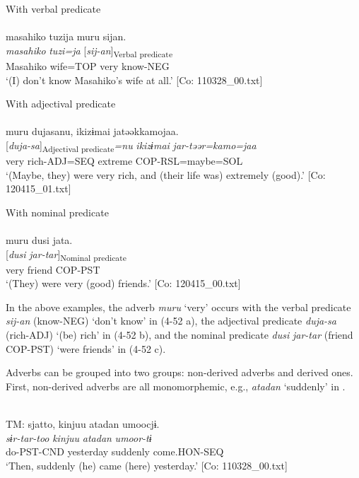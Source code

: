 \ea  \ea With verbal predicate \label{ex:4.52}\\\\
\glll    masahiko  tuzija  muru  sijan.\\
    \textit{masahiko}  \textit{tuzi=ja}  \textit{}  [\textit{sij-an}]\textsubscript{Verbal predicate}\\
    Masahiko  wife=TOP  very  know-NEG\\
    \glt     ‘(I) don’t know Masahiko’s wife at all.’ [Co: 110328\_00.txt]

  \ex With adjectival predicate\\\\
\glll    muru  dujasanu,  ikizɨmai  jatəəkkamojaa.\\
    \textit{}  [\textit{duja-sa}]\textsubscript{Adjectival predicate}\textit{=nu}  \textit{ikizɨmai}  \textit{jar-təər=kamo=jaa}\\
    very  rich-ADJ=SEQ  extreme  COP-RSL=maybe=SOL\\
    \glt     ‘(Maybe, they) were very rich, and (their life was) extremely (good).’ [Co: 120415\_01.txt]

\ex With nominal predicate\\\\
\glll  muru  dusi  jata.\\
    \textit{}  [\textit{dusi}  \textit{jar-tar}]\textsubscript{Nominal predicate}\\
    very  friend  COP-PST\\
    \glt     ‘(They) were very (good) friends.’ [Co: 120415\_00.txt]
    \z
\z

In the above examples, the adverb \textit{muru} ‘very’ occurs with the verbal predicate \textit{sij-an} (know-NEG) ‘don’t know’ in (4-52 a), the adjectival predicate \textit{duja-sa} (rich-ADJ) ‘(be) rich’ in (4-52 b), and the nominal predicate \textit{dusi} \textit{jar-tar} (friend COP-PST) ‘were friends’ in (4-52 c).

  Adverbs can be grouped into two groups: non-derived adverbs and derived ones. First, non-derived adverbs are all monomorphemic, e.g., \textit{atadan} ‘suddenly’ in .

\ea{} \label{ex:4.53}\\
\glll  TM:  sjatto,  kinjuu  atadan  umoocjɨ.\\
    \textit{sɨr-tar-too}  \textit{kinjuu}  \textit{atadan}  \textit{umoor-tɨ}\\
    do-PST-CND  yesterday  suddenly  come.HON-SEQ\\
  \glt     ‘Then, suddenly (he) came (here) yesterday.’ [Co: 110328\_00.txt]
\z

